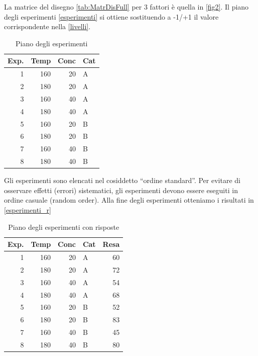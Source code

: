 \documentclass[
]{book}
\begin{document}
La matrice del disegno \autoref{tab:MatrDisFull} per 3 fattori è quella in \autoref{fig2}. Il piano degli esperimenti \autoref{esperimenti} si ottiene sostituendo a -1/+1 il valore corrispondente nella \autoref{livelli}.
\newpage

\begin{table}

\caption{\label{tab:unnamed-chunk-7}Piano degli esperimenti\label{esperimenti}}
\centering
\begin{tabular}[t]{r|r|r|l}
\hline
Exp. & Temp & Conc & Cat\\
\hline
1 & 160 & 20 & A\\
\hline
2 & 180 & 20 & A\\
\hline
3 & 160 & 40 & A\\
\hline
4 & 180 & 40 & A\\
\hline
5 & 160 & 20 & B\\
\hline
6 & 180 & 20 & B\\
\hline
7 & 160 & 40 & B\\
\hline
8 & 180 & 40 & B\\
\hline
\end{tabular}
\end{table}

Gli esperimenti sono elencati nel cosiddetto ``ordine standard''.
Per evitare di osservare effetti (errori) sistematici, gli esperimenti devono essere eseguiti in ordine casuale (random order). Alla fine degli esperimenti otteniamo i risultati in \autoref{esperimenti_r}

\begin{table}

\caption{\label{tab:unnamed-chunk-8}Piano degli esperimenti  con risposte\label{esperimenti_r}}
\centering
\begin{tabular}[t]{r|r|r|l|r}
\hline
Exp. & Temp & Conc & Cat & Resa\\
\hline
1 & 160 & 20 & A & 60\\
\hline
2 & 180 & 20 & A & 72\\
\hline
3 & 160 & 40 & A & 54\\
\hline
4 & 180 & 40 & A & 68\\
\hline
5 & 160 & 20 & B & 52\\
\hline
6 & 180 & 20 & B & 83\\
\hline
7 & 160 & 40 & B & 45\\
\hline
8 & 180 & 40 & B & 80\\
\hline
\end{tabular}
\end{table}
\end{document}
